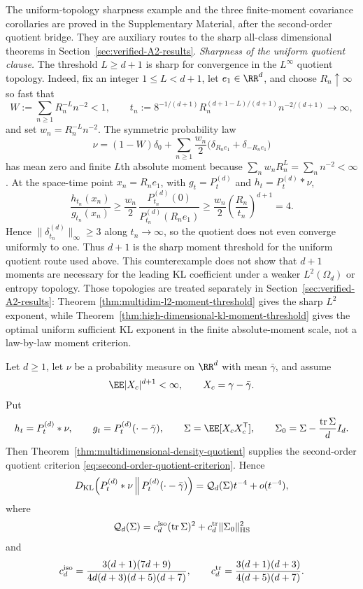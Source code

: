 \ifdefined\JFAArticleMain
The uniform-topology sharpness example and the three finite-moment covariance
corollaries are proved in the Supplementary Material, after the
second-order quotient bridge.  They are auxiliary routes to the
sharp all-class dimensional theorems in Section~\ref{sec:verified-A2-results}.
\else
\noindent\emph{Sharpness of the uniform quotient clause.}
The threshold \(L\ge d+1\) is sharp for convergence in the
\(L^\infty\) quotient topology.  Indeed, fix an integer
\(1\le L<d+1\), let \(e_1\in\RR^d\), and choose \(R_n\uparrow\infty\) so
fast that
\[
  W:=\sum_{n\ge1}R_n^{-L}n^{-2}<1,
  \qquad
  t_n:=8^{-1/(d+1)}
  R_n^{(d+1-L)/(d+1)}n^{-2/(d+1)}\to\infty,
\]
and set \(w_n=R_n^{-L}n^{-2}\).  The symmetric probability law
\[
  \nu=(1-W)\delta_0
  +\sum_{n\ge1}\frac{w_n}{2}
  \bigl(\delta_{R_ne_1}+\delta_{-R_ne_1}\bigr)
\]
has mean zero and finite \(L\)th absolute moment because
\(\sum_n w_nR_n^L=\sum_n n^{-2}<\infty\).  At the space-time point
\(x_n=R_ne_1\), with \(g_t=P_t^{(d)}\) and \(h_t=P_t^{(d)}*\nu\),
\[
\frac{h_{t_n}(x_n)}{g_{t_n}(x_n)}
\ge
\frac{w_n}{2}\,
\frac{P_{t_n}^{(d)}(0)}{P_{t_n}^{(d)}(R_ne_1)}
\ge
\frac{w_n}{2}\left(\frac{R_n}{t_n}\right)^{d+1}
=4 .
\]
Hence \(\|\delta_{t_n}^{(d)}\|_\infty\ge3\) along \(t_n\to\infty\), so
the quotient does not even converge uniformly to one.  Thus \(d+1\) is the
sharp moment threshold for the uniform quotient route used above.  This
counterexample does not show that \(d+1\) moments are necessary for the
leading KL coefficient under a weaker \(L^2(\Omega_d)\) or entropy topology.
Those topologies are treated separately in
Section~\ref{sec:verified-A2-results}: Theorem
\ref{thm:multidim-l2-moment-threshold} gives the sharp \(L^2\) exponent,
while Theorem~\ref{thm:high-dimensional-kl-moment-threshold} gives the
optimal uniform sufficient KL exponent in the finite absolute-moment scale,
not a law-by-law moment criterion.

\begin{corollary}%
\label{cor:finite-dplusone-moment-leading-multidim-coefficient}
Let \(d\ge1\), let \(\nu\) be a probability measure on \(\RR^d\) with mean
\(\bar{\gamma}\), and assume
\[
  \EE |X_c|^{d+1}<\infty,\qquad X_c=\gamma-\bar{\gamma} .
\]
Put
\[
  h_t=P_t^{(d)}*\nu,\qquad
  g_t=P_t^{(d)}(\cdot-\bar{\gamma}),\qquad
  \Sigma=\EE[X_cX_c^{\mathsf T}],\qquad
  \Sigma_0=\Sigma-\frac{\operatorname{tr}\Sigma}{d}I_d .
\]
Then Theorem~\ref{thm:multidimensional-density-quotient} supplies the
second-order quotient criterion
\eqref{eq:second-order-quotient-criterion}.  Hence
\[
D_{\rm KL}\!\left(P_t^{(d)}*\nu\,\middle\|\,
P_t^{(d)}(\cdot-\bar{\gamma})\right)
=\mathcal Q_d(\Sigma)t^{-4}+o(t^{-4}),
\]
where
\[
\mathcal Q_d(\Sigma)
=c_d^{\rm iso}(\operatorname{tr}\Sigma)^2
+c_d^{\rm tr}\|\Sigma_0\|_{\rm HS}^2
\]
and
\[
c_d^{\rm iso}=
\frac{3(d+1)(7d+9)}
{4d(d+3)(d+5)(d+7)},
\qquad
c_d^{\rm tr}=
\frac{3(d+1)(d+3)}
{4(d+5)(d+7)} .
\]
\end{corollary}

